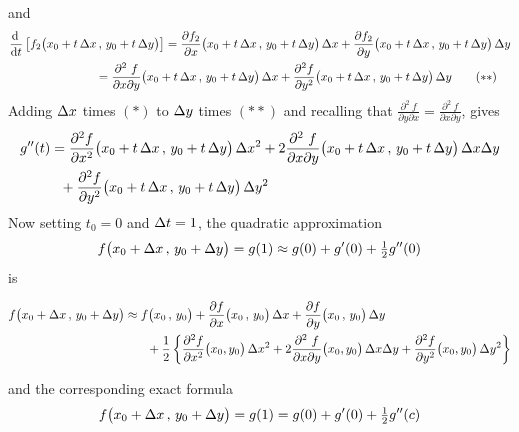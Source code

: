 and
\begin{align*}
&\diff{}{t}\left[f_2\big(x_0+t\,\De x\,,\,y_0+t\,\De y\big)\right]
=\frac{\partial f_2}{\partial x}\big(x_0+t\,\De x\,,\,y_0+t\,\De y\big)
                                                                  \,\De x
 +\frac{\partial f_2}{\partial y}
              \big(x_0+t\,\De x\,,\,y_0+t\,\De y\big) \,\De y \\
&\hskip1in
=\frac{\partial^2\ f}{\partial x\partial y}
           \big(x_0+t\,\De x\,,\,y_0+t\,\De y\big)  \,\De x
 +\frac{\partial^2 f}{\partial y^2}
              \big(x_0+t\,\De x\,,\,y_0+t\,\De y\big) \,\De y
\tag{$**$}\end{align*}
Adding $\Delta x$ times $(*)$ to $\Delta y$ times $(**)$
and recalling that
$\frac{\partial^2\ f}{\partial y\partial x}
                    =\frac{\partial^2\ f}{\partial x\partial y}$,
gives
\begin{align*}
g''(t) &= 
 \frac{\partial^2 f}{\partial x^2}\big(x_0+t\,\Delta x\,,\,y_0+t\,\Delta y\big)
                                                                  \,\Delta x^2
 +2\frac{\partial^2\ f}{\partial x\partial y}
              \big(x_0+t\,\Delta x\,,\,y_0+t\,\Delta y\big) \,\Delta x\Delta y \\
&\ \ + \frac{\partial^2 f}{\partial y^2}\big(x_0+t\,\Delta x\,,\,y_0+t\,\Delta y\big)
                                                                  \,\Delta y^2 
\end{align*}
Now setting $t_0=0$ and $\Delta t=1$, the quadratic approximation 
\begin{align*}
f\big(x_0 + \Delta x\,,\,y_0+\Delta y\big)
&=g(1)\approx g(0) +g'(0) +\tfrac{1}{2} g''(0) \\
\end{align*}
is
\begin{impeqn}\label{eqn quadratic approx}
\begin{align*}
f\big(x_0 + \De x\,,\,y_0+\De y\big)
&\approx f\big(x_0\,,\,y_0\big) 
       + \pdiff{f}{x}\big(x_0\,,\,y_0\big)\,\De x
       + \pdiff{f}{y}\big(x_0\,,\,y_0\big)\,\De y \\
&\hskip0.25in +\frac{1}{2}\left\{
        \frac{\partial^2 f}{\partial x^2}\big(x_0,y_0\big)\,\De x^2
       +2\frac{\partial^2\ f}{\partial x\partial y}
                                     \big(x_0,y_0\big) \,\De x\De y 
       + \frac{\partial^2 f}{\partial y^2}\big(x_0,y_0\big)\,\De y^2
\right\}
\end{align*}
\end{impeqn}\noindent
and the corresponding exact formula
\begin{align*}
f\big(x_0 + \Delta x\,,\,y_0+\Delta y\big)
&=g(1) = g(0) +g'(0) +\tfrac{1}{2} g''(c) \\
\end{align*}
